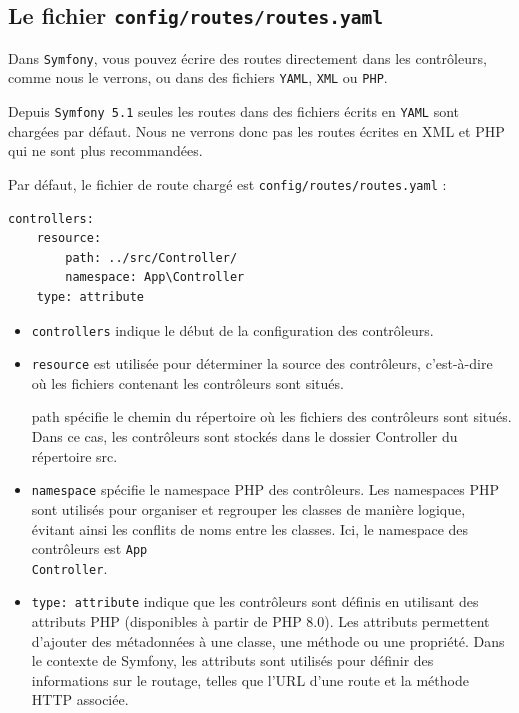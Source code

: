 \documentclass{article}
\begin{document}
\subsection{Le fichier {\tt config/routes/routes.yaml}}
Dans {\tt Symfony}, vous pouvez écrire des routes directement dans les contrôleurs, comme nous le verrons, ou dans des fichiers {\tt YAML}, {\tt XML} ou {\tt PHP}.

Depuis {\tt Symfony 5.1} seules les routes dans des fichiers écrits en {\tt YAML} sont chargées par défaut. Nous ne verrons donc pas les routes écrites en XML et PHP qui ne sont plus recommandées.

Par défaut, le fichier de route chargé est {\tt config/routes/routes.yaml} :
\begin{verbatim}
controllers:
    resource:
        path: ../src/Controller/
        namespace: App\Controller
    type: attribute
\end{verbatim}

\begin{itemize}
\item {\tt controllers} indique le début de la configuration des contrôleurs.

\item {\tt resource} est utilisée pour déterminer la source des contrôleurs, c'est-à-dire où les fichiers contenant les contrôleurs sont situés.

path spécifie le chemin du répertoire où les fichiers des contrôleurs sont situés. Dans ce cas, les contrôleurs sont stockés dans le dossier Controller du répertoire src.

\item {\tt namespace} spécifie le namespace PHP des contrôleurs. Les namespaces PHP sont utilisés pour organiser et regrouper les classes de manière logique, évitant ainsi les conflits de noms entre les classes. Ici, le namespace des contrôleurs est {\tt App\\Controller}.

\item {\tt type: attribute} indique que les contrôleurs sont définis en utilisant des attributs PHP (disponibles à partir de PHP 8.0). Les attributs permettent d'ajouter des métadonnées à une classe, une méthode ou une propriété. Dans le contexte de Symfony, les attributs sont utilisés pour définir des informations sur le routage, telles que l'URL d'une route et la méthode HTTP associée.

\end{itemize}
\end{document}
